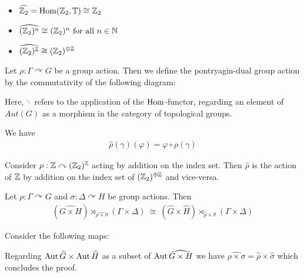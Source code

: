 \begin{Example}
	\label{the_zero_divisor_problem:pontryagin_duality:example_duals}
	\
	\begin{itemize}
		\item {$\widehat{\mathbb{Z}_2} = \operatorname{Hom}(\mathbb{Z}_2,\mathbb{T}) \cong \mathbb{Z}_2$}
		\item {$\widehat{(\mathbb{Z}_2)^n} \cong (\mathbb{Z}_2)^n ~\text{for all}~ n \in \mathbb{N}$}
		\item {$\widehat{(\mathbb{Z}_2)^{\mathbb{Z}}} \cong (\mathbb{Z}_2)^{\oplus \mathbb{Z}}$}
	\end{itemize}
\end{Example}

\begin{Definition}
	Let $\rho: \Gamma \curvearrowright G$ be a group action.
	Then we define the {pontryagin-dual group action} by the commutativity of the following diagram:
	\begin{figure}[H]
		\centering
		
	\end{figure}
	Here, $\widehat{\cdot}$ refers to the application of the $\operatorname{Hom}$-functor, regarding an element of $Aut(G)$ as a morphism in the category of topological groups.
\end{Definition}
\begin{Remark}
	We have
	\begin{align*}
		\widehat{\rho}(\gamma)(\varphi) = \varphi \circ \rho(\gamma)
	\end{align*}
\end{Remark}
\begin{Example}
	\label{the_zero_divisor_problem:pontryagin_duality:example_dual_action}
	Consider $\rho: \mathbb{Z} \curvearrowright (\mathbb{Z}_2)^{\mathbb{Z}}$ acting by addition on the index set.
	Then $\widehat{\rho}$ is the action of $\mathbb{Z}$ by addition on the index set of $(\mathbb{Z}_2)^{\oplus \mathbb{Z}}$ and vice-versa.
\end{Example}

\begin{Lemma}
	\label{the_zero_divisor_problem:pontryagin_duality:lemma_product_of_dual_group_actions}
	Let $\rho: \Gamma \curvearrowright G$ and $\sigma: \Delta \curvearrowright H$ be group actions. Then
	\begin{align*}
		(\widehat{G \times H}) \rtimes_{\widehat{\rho \times \sigma}} (\Gamma \times \Delta) ~\cong~ (\widehat{G} \times \widehat{H}) \rtimes_{\widehat{\rho} \times \widehat{\sigma}} (\Gamma \times \Delta)
	\end{align*}
\end{Lemma}

\proof
	Consider the following maps:
	\begin{figure}[H]
		\centering
		
	\end{figure}
	Regarding $\operatorname{Aut}{\widehat{G}} \times \operatorname{Aut}{\widehat{H}}$ as a subset of $\operatorname{Aut} \widehat{G \times H}$ we have $\widehat{\rho \times \sigma} = \widehat{\rho} \times \widehat{\sigma}$ which concludes the proof.
\endproof

